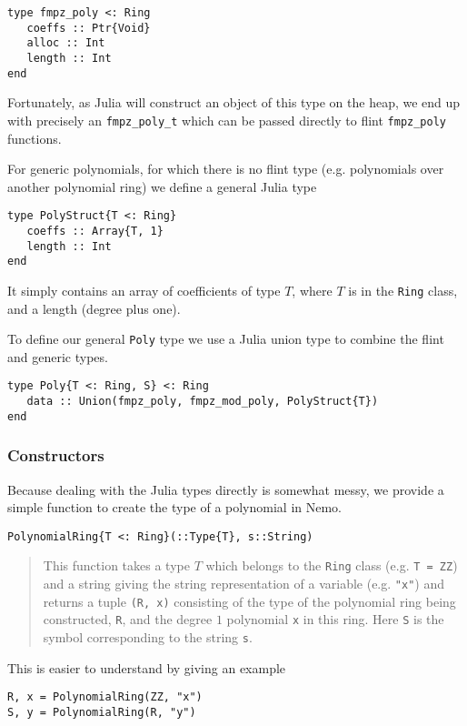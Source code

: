 \documentclass[a4paper,10pt]{article}
\newcommand{\code}{\lstinline}
\newcommand{\desc}[1]{\vspace{-3mm}\begin{quote}#1\end{quote}}
\begin{document}
{{{\begin{lstlisting}
type fmpz_poly <: Ring
   coeffs :: Ptr{Void}
   alloc :: Int
   length :: Int
end
\end{lstlisting}

Fortunately, as Julia will construct an object of this type on the heap, we end up with
precisely an \code{fmpz_poly_t} which can be passed directly to flint \code{fmpz_poly}
functions.

For generic polynomials, for which there is no flint type (e.g. polynomials over another
polynomial ring) we define a general Julia type

\begin{lstlisting}
type PolyStruct{T <: Ring}
   coeffs :: Array{T, 1}
   length :: Int
end
\end{lstlisting}

It simply contains an array of coefficients of type $T$, where $T$ is in the \code{Ring}
class, and a length (degree plus one).

To define our general \code{Poly} type we use a Julia union type to combine the flint
and generic types.

\begin{lstlisting}
type Poly{T <: Ring, S} <: Ring
   data :: Union(fmpz_poly, fmpz_mod_poly, PolyStruct{T})
end
\end{lstlisting}

\subsubsection{Constructors}

Because dealing with the Julia types directly is somewhat messy, we provide a simple
function to create the type of a polynomial in Nemo.

\begin{lstlisting}
PolynomialRing{T <: Ring}(::Type{T}, s::String)
\end{lstlisting}

\desc{This function takes a type $T$ which belongs to the \code|Ring| class 
(e.g. \code|T = ZZ|) and a string giving the string representation of a variable (e.g. 
\code|"x"|) and returns a tuple \code|(R, x)| consisting of the type of the polynomial
ring being constructed, \code|R|, and the degree $1$ polynomial \code|x| in this ring. 
Here \code|S| is the symbol corresponding to the string \code|s|.}

This is easier to understand by giving an example

\begin{lstlisting}
R, x = PolynomialRing(ZZ, "x")
S, y = PolynomialRing(R, "y")


\end{lstlisting}}}}
\end{document}
